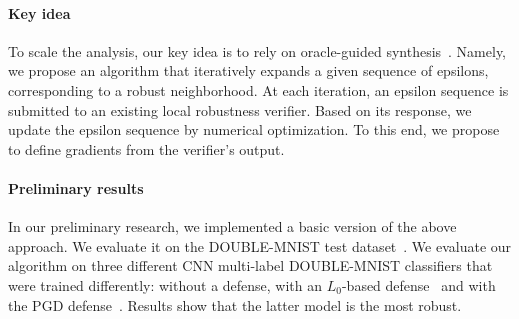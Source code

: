 \paragraph{Key idea} To scale the analysis, our key idea is to rely on oracle-guided synthesis~\cite{OracleGuided}.
Namely, we propose an algorithm that iteratively expands a given sequence of epsilons, corresponding to a robust neighborhood.
At each iteration, an epsilon sequence is submitted to an existing local robustness verifier. %
Based on its response, we update the epsilon sequence by numerical optimization.
To this end, we propose to define gradients from the verifier's output. %

\paragraph{Preliminary results}
In our preliminary research, we implemented a basic version of the above approach.
We evaluate it on the DOUBLE-MNIST test dataset~\cite{DoubleMNIST}.
We evaluate our algorithm on three different CNN multi-label DOUBLE-MNIST classifiers that were trained differently: without a defense, with an $L_0$-based defense~\cite{L0} and with the PGD defense~\cite{PGD}.
Results show that the latter model is the most robust. %
